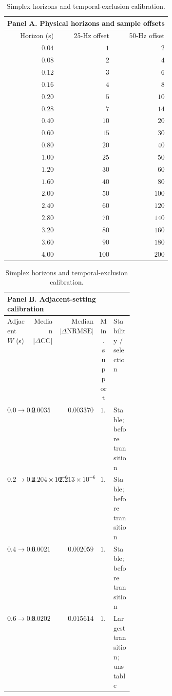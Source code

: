 \begin{table}[p]
\centering
\footnotesize
\setlength{\tabcolsep}{2.2pt}
\renewcommand{\arraystretch}{1.08}
\caption{Simplex horizons and temporal-exclusion calibration.}
\label{tab:supp_simplex}
\begin{tabular}{rrr}
\toprule
\multicolumn{3}{l}{\textbf{Panel A. Physical horizons and sample offsets}} \\
\midrule
Horizon (s) & 25-Hz offset & 50-Hz offset \\
\midrule
$0.04$ & $1$ & $2$ \\
$0.08$ & $2$ & $4$ \\
$0.12$ & $3$ & $6$ \\
$0.16$ & $4$ & $8$ \\
$0.20$ & $5$ & $10$ \\
$0.28$ & $7$ & $14$ \\
$0.40$ & $10$ & $20$ \\
$0.60$ & $15$ & $30$ \\
$0.80$ & $20$ & $40$ \\
$1.00$ & $25$ & $50$ \\
$1.20$ & $30$ & $60$ \\
$1.60$ & $40$ & $80$ \\
$2.00$ & $50$ & $100$ \\
$2.40$ & $60$ & $120$ \\
$2.80$ & $70$ & $140$ \\
$3.20$ & $80$ & $160$ \\
$3.60$ & $90$ & $180$ \\
$4.00$ & $100$ & $200$ \\
\bottomrule
\end{tabular}
\par\medskip
\begin{tabular}{lrrc>{\raggedright\arraybackslash}p{0.30\linewidth}}
\toprule
\multicolumn{5}{l}{\textbf{Panel B. Adjacent-setting calibration}} \\
\midrule
Adjacent $W$ (s) & Median $|\Delta\mathrm{CC}|$ & Median $|\Delta\mathrm{NRMSE}|$ & Min. support & Stability / selection \\
\midrule
$0.0 \to 0.2$ & $0.003550$ & $0.003370$ & $1.00$ & Stable; before transition \\
$0.2 \to 0.4$ & $2.204\times10^{-6}$ & $2.213\times10^{-6}$ & $1.00$ & Stable; before transition \\
$0.4 \to 0.6$ & $0.002137$ & $0.002059$ & $1.00$ & Stable; before transition \\
$0.6 \to 0.8$ & $0.020254$ & $0.015614$ & $1.00$ & Largest transition; unstable \\

\end{tabular}
\end{table}
